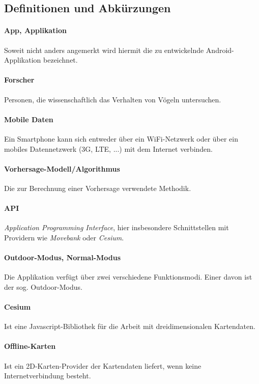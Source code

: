 \documentclass[12pt]{article} %
\begin{document}



\subsection{Definitionen und Abkürzungen}

	\paragraph{App, Applikation} Soweit nicht anders angemerkt wird hiermit die zu entwickelnde Android-Applikation bezeichnet.
	 \paragraph{Forscher} Personen, die wissenschaftlich das Verhalten von Vögeln untersuchen.
	 \paragraph{Mobile Daten} Ein Smartphone kann sich entweder über ein WiFi-Netzwerk oder über ein mobiles Datennetzwerk (3G, LTE, ...) mit dem Internet verbinden. 
	\paragraph{Vorhersage-Modell/Algorithmus} Die zur Berechnung einer Vorhersage verwendete Methodik. 
	\paragraph{API} \textit{Application Programming Interface}, hier insbesondere Schnittstellen mit Providern wie \textit{Movebank} oder \textit{Cesium}. 
	\paragraph{Outdoor-Modus, Normal-Modus} Die Applikation verfügt über zwei verschiedene Funktionsmodi. Einer davon ist der sog. Outdoor-Modus.
	\paragraph{Cesium} Ist eine Javascript-Bibliothek für die Arbeit mit dreidimensionalen Kartendaten.
	\paragraph{Offline-Karten} Ist ein 2D-Karten-Provider der Kartendaten liefert, wenn keine Internetverbindung besteht.
\end{document}

